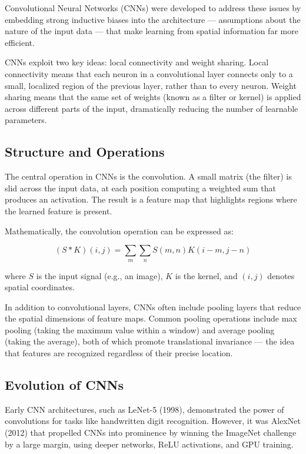 \documentclass[openany]{book}
\begin{document}
Convolutional Neural Networks (CNNs) were developed to address these issues by 
embedding strong inductive biases into the architecture — assumptions about the 
nature of the input data — that make learning from spatial information far more 
efficient.

CNNs exploit two key ideas: local connectivity and weight sharing. Local 
connectivity means that each neuron in a convolutional layer connects only to a 
small, localized region of the previous layer, rather than to every neuron. 
Weight sharing means that the same set of weights (known as a filter or kernel) 
is applied across different parts of the input, dramatically reducing the number 
of learnable parameters.

\subsection{Structure and Operations}

The central operation in CNNs is the convolution. A small matrix (the filter) is 
slid across the input data, at each position computing a weighted sum that 
produces an activation. The result is a feature map that highlights regions 
where the learned feature is present.

Mathematically, the convolution operation can be expressed as:

\begin{equation}
(S \ast K)(i,j) = \sum_{m} \sum_{n} S(m,n)K(i - m,j - n)
\end{equation}

where $S$ is the input signal (e.g., an image), $K$ is the kernel, and $(i,j)$ 
denotes spatial coordinates.

In addition to convolutional layers, CNNs often include pooling layers that 
reduce the spatial dimensions of feature maps. Common pooling operations include 
max pooling (taking the maximum value within a window) and average pooling 
(taking the average), both of which promote translational invariance — the idea 
that features are recognized regardless of their precise location.

\subsection{Evolution of CNNs}

Early CNN architectures, such as LeNet-5 (1998), demonstrated the power of 
convolutions for tasks like handwritten digit recognition. However, it was 
AlexNet (2012) that propelled CNNs into prominence by winning the ImageNet 
challenge by a large margin, using deeper networks, ReLU activations, and GPU 
training.
\end{document}
